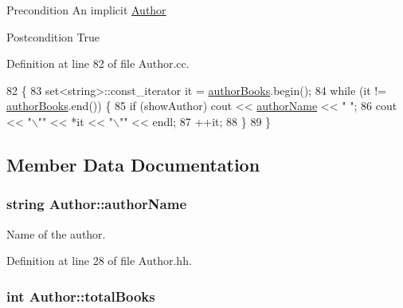 \begin{DoxyPrecond}{Precondition}
An implicit \hyperlink{class_author}{Author} 
\end{DoxyPrecond}
\begin{DoxyPostcond}{Postcondition}
True 
\end{DoxyPostcond}


Definition at line 82 of file Author.\+cc.


\begin{DoxyCode}
82                                        \{
83     set<string>::const\_iterator it = \hyperlink{class_author_ad9ffe450cdafed2242936f6fcafa22b4}{authorBooks}.begin();
84     \textcolor{keywordflow}{while} (it != \hyperlink{class_author_ad9ffe450cdafed2242936f6fcafa22b4}{authorBooks}.end()) \{
85         \textcolor{keywordflow}{if} (showAuthor) cout << \hyperlink{class_author_a146b76b89d701097c36fb5d29df27bc4}{authorName} << \textcolor{stringliteral}{" "};
86         cout << \textcolor{stringliteral}{"\(\backslash\)""} << *it << \textcolor{stringliteral}{"\(\backslash\)""} << endl;
87         ++it;
88     \}
89 \}\end{DoxyCode}


\subsection{Member Data Documentation}
\subsubsection[{\texorpdfstring{author\+Name}{authorName}}]{\setlength{\rightskip}{0pt plus 5cm}string Author\+::author\+Name\hspace{0.3cm}{\ttfamily [private]}}\hypertarget{class_author_a146b76b89d701097c36fb5d29df27bc4}{}\label{class_author_a146b76b89d701097c36fb5d29df27bc4}


Name of the author. 



Definition at line 28 of file Author.\+hh.

\subsubsection[{\texorpdfstring{total\+Books}{totalBooks}}]{\setlength{\rightskip}{0pt plus 5cm}int Author\+::total\+Books\hspace{0.3cm}{\ttfamily [private]}}\hypertarget{class_author_ac870b8c861aa0f69cd2c4e7b8d414902}{}\label{class_author_ac870b8c861aa0f69cd2c4e7b8d414902}



